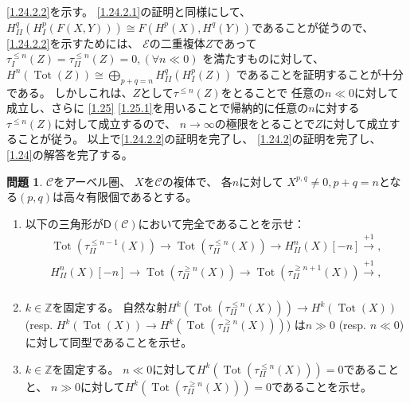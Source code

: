 \documentclass[uplatex,dvipdfmx]{jsarticle}
\makeatletter
\theoremstyle{definition}
\newtheorem{prob}[prob]{問題}
\renewenvironment{proof}[1][\proofname]{
  \pushQED{\qed}%
  \normalfont \topsep6\p@\@plus6\p@\relax
  \trivlist
  \item[\hskip\labelsep
    #1\@addpunct{\textbf{.}}]\ignorespaces
}{%
  \popQED\endtrivlist\@endpefalse
}
\providecommand{\proofname}{証明}
\DeclareMathOperator{\Tot}{\mathrm{Tot}}
\newcommand{\sfD}{\mathsf{D}}
\newcommand\Z{\mathbb{Z}}
\newcommand\mcC{\mathcal{C}}
\newcommand\mcE{\mathcal{E}}
\makeatother
\begin{document}
\begin{proof}
  \ref{1.24.2.2}を示す。
  \ref{1.24.2.1}の証明と同様にして、
  \(H_{II}^q(H_I^p(F(X,Y)))\cong F(H^p(X),H^q(Y))\)であることが従うので、
  \ref{1.24.2.2}を示すためには、
  \(\mcE\)の二重複体\(Z\)であって
  \(\tau_I^{\leq n}(Z)=\tau_{II}^{\leq n}(Z) = 0, (\forall n \ll 0)\)
  を満たすものに対して、
  \(H^n(\Tot(Z)) \cong \bigoplus_{p+q=n}H_{II}^q(H_I^p(Z))\)
  であることを証明することが十分である。
  しかしこれは、\(Z\)として\(\tau^{\leq n}(Z)\)をとることで
  任意の\(n\ll 0\)に対して成立し、さらに
  \autoref{1.25} \ref{1.25.1}を用いることで帰納的に任意の\(n\)に対する
  \(\tau^{\leq n}(Z)\)に対して成立するので、
  \(n\to \infty\)の極限をとることで\(Z\)に対して成立することが従う。
  以上で\ref{1.24.2.2}の証明を完了し、
  \ref{1.24.2}の証明を完了し、
  \autoref{1.24}の解答を完了する。
\end{proof}










\begin{prob}\label{1.25}
  \(\mcC\)をアーベル圏、
  \(X\)を\(\mcC\)の複体で、
  各\(n\)に対して
  \(X^{p,q}\neq 0, p+q=n\)となる\((p,q)\)は高々有限個であるとする。
  \begin{enumerate}
    \item \label{1.25.1}
    以下の三角形が\(\sfD(\mcC)\)において完全であることを示せ：
    \begin{align*}
      \Tot(\tau_{II}^{\leq n-1}(X)) \to
      \Tot(\tau_{II}^{\leq n}(X)) \to
      H_{II}^n(X)[-n] \xrightarrow{+1}, \\
      H_{II}^n(X)[-n] \to
      \Tot(\tau_{II}^{\geq n}(X)) \to
      \Tot(\tau_{II}^{\geq n+1}(X)) \xrightarrow{+1}, \\
    \end{align*}
    \item \label{1.25.2}
    \(k\in \Z\)を固定する。
    自然な射\(H^k(\Tot(\tau_{II}^{\leq n}(X))) \to H^k(\Tot(X))\)
    (resp. \(H^k(\Tot(X))\to H^k(\Tot(\tau_{II}^{\geq n}(X)))\))
    は\(n\gg 0\) (resp. \(n \ll 0\)) に対して同型であることを示せ。
    \item \label{1.25.3}
    \(k\in \Z\)を固定する。
    \(n \ll 0\)に対して\(H^k(\Tot(\tau_{II}^{\leq n}(X))) = 0\)であることと、
    \(n \gg 0\)に対して\(H^k(\Tot(\tau_{II}^{\geq n}(X))) = 0\)であることを示せ。
  \end{enumerate}
\end{prob}
\end{document}

